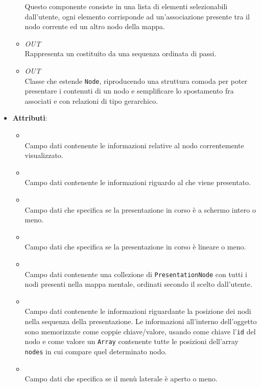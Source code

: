 \begin{itemize}
\begin{itemize}
Questo componente consiste in una lista di elementi selezionabili dall’utente, ogni elemento corrisponde ad un'associazione presente tra il nodo corrente ed un altro nodo della mappa.
\item \textit{OUT} \hyperref[\nogloxy{Premi::Front-End::Model::Path}]{}\\
Rappresenta un  costituito da una sequenza ordinata di passi.
\item \textit{OUT} \hyperref[\nogloxy{Premi::Front-End::Model::PresentationNode}]{}\\
Classe che estende \texttt{Node}, riproducendo una struttura comoda per poter presentare i contenuti di un nodo e semplificare lo spostamento fra  associati e con relazioni di tipo gerarchico.
\end{itemize}
\item \textbf{Attributi}:
\begin{itemize}
\item {}
\\ Campo dati contenente le informazioni relative al nodo correntemente visualizzato.
\item {}
\\ Campo dati contenente le informazioni riguardo al  che viene presentato.
\item {}
\\ Campo dati che specifica se la presentazione in corso è a schermo intero o meno.
\item {}
\\ Campo dati che specifica se la presentazione in corso è lineare o meno.
\item {}
\\ Campo dati contenente una collezione di \texttt{PresentationNode} con tutti i nodi presenti nella mappa mentale, ordinati secondo il  scelto dall'utente.
\item {}
\\ Campo dati contenente le informazioni riguardante la posizione dei nodi nella sequenza della presentazione. Le informazioni all'interno dell'oggetto sono memorizzate come coppie chiave/valore, usando come chiave l'\texttt{id} del nodo e come valore un \texttt{Array} contenente tutte le posizioni dell'array \texttt{nodes} in cui compare quel determinato nodo.
\item {}
\\ Campo dati che specifica se il menù laterale è aperto o meno.
\end{itemize}
\end{itemize}
